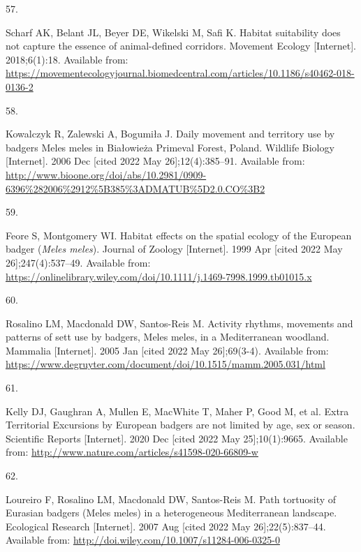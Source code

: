\documentclass[10pt,a4paper]{article}
\newlength{\cslhangindent}
\newlength{\csllabelwidth}
\newlength{\cslentryspacingunit} %
\newenvironment{CSLReferences}[2] %
 {%
  \setlength{\parindent}{0pt}
  \ifodd #1
  \let\oldpar\par
  \def\par{\hangindent=\cslhangindent\oldpar}
  \fi
  \setlength{\parskip}{#2\cslentryspacingunit}
 }%
 {}
\newcommand{\CSLLeftMargin}[1]{\parbox[t]{\csllabelwidth}{#1}}
\newcommand{\CSLRightInline}[1]{\parbox[t]{\linewidth - \csllabelwidth}{#1}\break}
\begin{document}
\begin{CSLReferences}{0}{0}
\leavevmode{}%
\CSLLeftMargin{57. }
\CSLRightInline{Scharf AK, Belant JL, Beyer DE, Wikelski M, Safi K. Habitat suitability does not capture the essence of animal-defined corridors. Movement Ecology {[}Internet{]}. 2018;6(1):18. Available from: \url{https://movementecologyjournal.biomedcentral.com/articles/10.1186/s40462-018-0136-2}}

\leavevmode{}%
\CSLLeftMargin{58. }
\CSLRightInline{Kowalczyk R, Zalewski A, Bogumiła J. Daily movement and territory use by badgers {Meles} meles in {Białowieża} {Primeval} {Forest}, {Poland}. Wildlife Biology {[}Internet{]}. 2006 Dec {[}cited 2022 May 26{]};12(4):385--91. Available from: \url{http://www.bioone.org/doi/abs/10.2981/0909-6396\%282006\%2912\%5B385\%3ADMATUB\%5D2.0.CO\%3B2}}

\leavevmode{}%
\CSLLeftMargin{59. }
\CSLRightInline{Feore S, Montgomery WI. Habitat effects on the spatial ecology of the {European} badger (\emph{{Meles} meles}). Journal of Zoology {[}Internet{]}. 1999 Apr {[}cited 2022 May 26{]};247(4):537--49. Available from: \url{https://onlinelibrary.wiley.com/doi/10.1111/j.1469-7998.1999.tb01015.x}}

\leavevmode{}%
\CSLLeftMargin{60. }
\CSLRightInline{Rosalino LM, Macdonald DW, Santos-Reis M. Activity rhythms, movements and patterns of sett use by badgers, {Meles} meles, in a {Mediterranean} woodland. Mammalia {[}Internet{]}. 2005 Jan {[}cited 2022 May 26{]};69(3-4). Available from: \url{https://www.degruyter.com/document/doi/10.1515/mamm.2005.031/html}}

\leavevmode{}%
\CSLLeftMargin{61. }
\CSLRightInline{Kelly DJ, Gaughran A, Mullen E, MacWhite T, Maher P, Good M, et al. Extra {Territorial} {Excursions} by {European} badgers are not limited by age, sex or season. Scientific Reports {[}Internet{]}. 2020 Dec {[}cited 2022 May 25{]};10(1):9665. Available from: \url{http://www.nature.com/articles/s41598-020-66809-w}}

\leavevmode{}%
\CSLLeftMargin{62. }
\CSLRightInline{Loureiro F, Rosalino LM, Macdonald DW, Santos-Reis M. Path tortuosity of {Eurasian} badgers ({Meles} meles) in a heterogeneous {Mediterranean} landscape. Ecological Research {[}Internet{]}. 2007 Aug {[}cited 2022 May 26{]};22(5):837--44. Available from: \url{http://doi.wiley.com/10.1007/s11284-006-0325-0}}


\end{CSLReferences}
\end{document}
